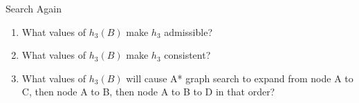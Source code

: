 \begin{problem}{Search Again}
\begin{question}
\begin{subquestion}[9]
\begin{enumerate}
\item What values of $h_3(B)$ make $h_3$ admissible?

\fivelasta

\item What values of $h_3(B)$ make $h_3$ consistent?


\fivelastb

\item What values of $h_3(B)$ will cause A* graph search to expand
  from node A to C, then node A to B, then node A to B to D in that
  order?

\fivelastc

\end{enumerate}

\end{subquestion}

\end{question}

\end{problem}